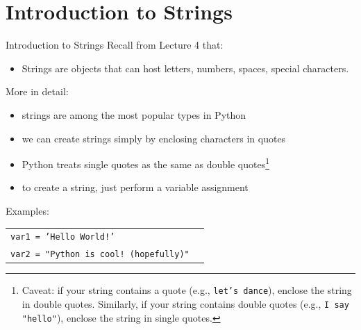 \documentclass[t,handout,9pt]{beamer}
\begin{document}
\section{Introduction to Strings}
\begin{frame}{Introduction to Strings}
\vfill
Recall from Lecture 4 that:
\begin{itemize}
	\item Strings are objects that can host letters, numbers, spaces, special characters.
\end{itemize}
\vfill
More in detail:
\begin{itemize}
	\item strings are among the most popular types in Python
	\item we can create strings simply by enclosing characters in quotes
	\item Python treats single quotes as the same as double quotes\footnote{Caveat: if your string contains a quote (e.g., \texttt{let's dance}), enclose the string in double quotes. Similarly, if your string contains double quotes (e.g., \texttt{I say "hello"}), enclose the string in single quotes.}
	\item to create a string, just perform a variable assignment
\end{itemize}
\vfill
Examples:\\
\begin{table}[]
\begin{flushleft}
\begin{tabular}{ll}
\texttt{var1 = 'Hello World!'} &  \\
\texttt{var2 = "Python is cool! (hopefully)"} &  \\
\end{tabular}
\end{flushleft}
\end{table}
\vfill
\end{frame}
%
\end{document}
